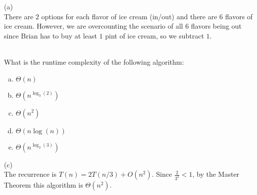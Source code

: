 \begin{solution}
\begin{enumerate}[(a)]
\begin{enumerate}[(a)]
\end{enumerate}
\begin{solution}

(a)\\
There are $2$ options for each flavor of ice cream (in/out) and there are $6$ flavors of ice cream. However, we are overcounting the scenario of all $6$ flavors being out since Brian has to buy at least $1$ pint of ice cream, so we subtract $1$.

\end{solution}
\\
What is the runtime complexity of the following algorithm:
\begin{algorithm}[H]
    \DontPrintSemicolon
    \BlankLine
     \caption{A bad search algorithm}
\end{algorithm}
\begin{enumerate}[(a)]
	\item  $\Theta(n)$

	\item  $\Theta(n^{\log_3(2)})$

	\item  $\Theta(n^2)$

	\item  $\Theta(n\log(n))$

	\item  $\Theta(n^{\log_2(3)})$

\end{enumerate}
\begin{solution}

(c)\\
The recurrence is $T(n)=2T(n/3)+O(n^2)$. Since $\frac{2}{3^2}<1$, by the Master Theorem this algorithm is $\Theta(n^2)$.


\end{solution}
\end{enumerate}
\end{solution}
